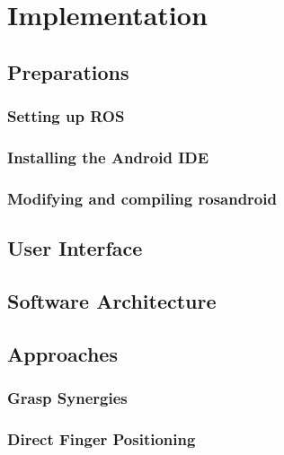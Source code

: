\documentclass[11pt,DIV=15,BCOR=20mm,bibliography=totoc]{scrbook}
\begin{document}


\frontmatter

\tableofcontents
\cleardoublepage

\mainmatter





\chapter{Implementation}
\section{Preparations}
\subsection{Setting up ROS}
\subsection{Installing the Android IDE}
\subsection{Modifying and compiling rosandroid}
\label{impl:compiling_rosandroid}

\section{User Interface}

\section{Software Architecture}

\section{Approaches}

\subsection{Grasp Synergies}

\subsection{Direct Finger Positioning}
\end{document}
